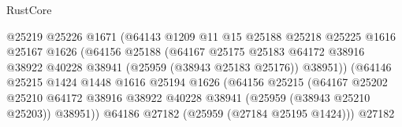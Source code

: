 \begin{lexlean}{RustCore}
\begin{coremodule}
                                          @25219
                                          @25226
                                          @1671
                                          (@64143
                                            @1209
                                            @11
                                            @15
                                            @25188
                                            @25218
                                            @25225
                                            @1616
                                            @25167
                                            @1626
                                            (@64156
                                              @25188
                                              (@64167
                                                @25175
                                                @25183
                                                @64172
                                                @38916
                                                @38922
                                                @40228
                                                @38941
                                                (@25959 (@38943 @25183 @25176))
                                                @38951))
                                            (@64146
                                              @25215
                                              @1424
                                              @1448
                                              @1616
                                              @25194
                                              @1626
                                              (@64156
                                                @25215
                                                (@64167
                                                  @25202
                                                  @25210
                                                  @64172
                                                  @38916
                                                  @38922
                                                  @40228
                                                  @38941
                                                  (@25959 (@38943 @25210 @25203))
                                                  @38951))
                                              @64186
                                              @27182
                                              (@25959 (@27184 @25195 @1424)))
                                            @27182

\end{coremodule}
\end{lexlean}
